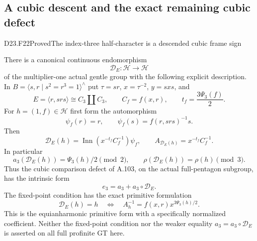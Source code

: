 \subsection{A cubic descent and the exact remaining cubic defect}

\begin{statement}{D23.F22}{Proved}{The index-three half-character is a descended cubic frame sign}
\end{statement}
There is a canonical continuous endomorphism
\[
 \mathcal D_E:\mathcal H\longrightarrow\mathcal H
\]
of the multiplier-one actual gentle group with the following explicit
description. In $B=\langle s,r\mid s^2=r^3=1\rangle^{\wedge}$ put
$\tau=sr$, $x=\tau^{-2}$, $y=sxs$, and
\[
 E=\langle r,srs\rangle\cong C_3\amalg C_3,
 \qquad C_f=f(x,r),\qquad t_f=\frac{3\Psi_3(f)}2.
\]
For $h=(1,f)\in\mathcal H$ first form the automorphism
\[
 \psi_f(r)=r,\qquad
 \psi_f(s)=f(r,srs)^{-1}s.
\]
Then
\[
 \boxed{\quad
 \mathcal D_E(h)=\operatorname{Inn}(x^{-t_f}C_f^{-1})\psi_f,
 \qquad A_{\mathcal D_E(h)}=x^{-t_f}C_f^{-1}.
 \quad}                                                     \tag{D23.F22.1}
\]
In particular
\[
 \boxed{\quad
 a_3(\mathcal D_E(h))=\Psi_3(h)/2\pmod2,\qquad
 \rho(\mathcal D_E(h))=\rho(h)\pmod3.
 \quad}                                                     \tag{D23.F22.2}
\]
Thus the cubic comparison defect of \textup{A.103}, on the actual
full-pentagon subgroup, has the intrinsic form
\[
 e_3=a_3+a_3\circ\mathcal D_E.
                                                               \tag{D23.F22.3}
\]
The fixed-point condition has the exact primitive formulation
\[
 \mathcal D_E(h)=h
 \quad\Longleftrightarrow\quad
 A_h^{-1}=f(x,r)x^{3\Psi_3(h)/2}.                              \tag{D23.F22.4}
\]
This is the equianharmonic primitive form with a specifically
normalized coefficient. Neither the fixed-point condition nor the
weaker equality $a_3=a_3\circ\mathcal D_E$ is asserted on all full
profinite GT here.

